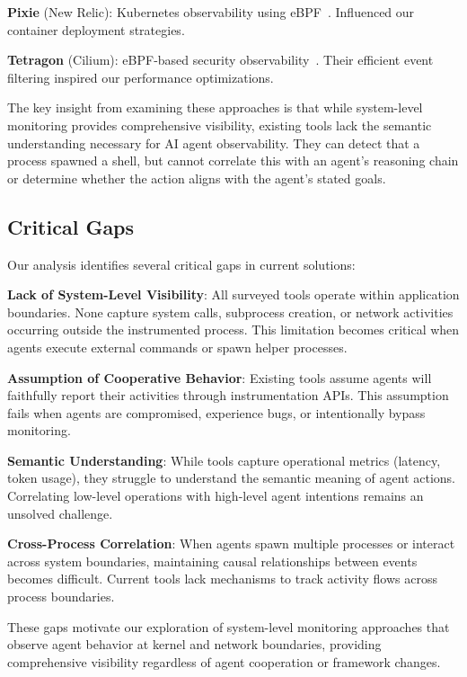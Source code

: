 \documentclass[sigplan,screen，review,9pt]{acmart}
\begin{document}
\textbf{Pixie} (New Relic): Kubernetes observability using eBPF~\cite{pixie}. Influenced our container deployment strategies.

\textbf{Tetragon} (Cilium): eBPF-based security observability~\cite{tetragon}. Their efficient event filtering inspired our performance optimizations.

The key insight from examining these approaches is that while system-level monitoring provides comprehensive visibility, existing tools lack the semantic understanding necessary for AI agent observability. They can detect that a process spawned a shell, but cannot correlate this with an agent's reasoning chain or determine whether the action aligns with the agent's stated goals.

\subsection{Critical Gaps}

Our analysis identifies several critical gaps in current solutions:

\textbf{Lack of System-Level Visibility}: All surveyed tools operate within application boundaries. None capture system calls, subprocess creation, or network activities occurring outside the instrumented process. This limitation becomes critical when agents execute external commands or spawn helper processes.

\textbf{Assumption of Cooperative Behavior}: Existing tools assume agents will faithfully report their activities through instrumentation APIs. This assumption fails when agents are compromised, experience bugs, or intentionally bypass monitoring.

\textbf{Semantic Understanding}: While tools capture operational metrics (latency, token usage), they struggle to understand the semantic meaning of agent actions. Correlating low-level operations with high-level agent intentions remains an unsolved challenge.

\textbf{Cross-Process Correlation}: When agents spawn multiple processes or interact across system boundaries, maintaining causal relationships between events becomes difficult. Current tools lack mechanisms to track activity flows across process boundaries.

These gaps motivate our exploration of system-level monitoring approaches that observe agent behavior at kernel and network boundaries, providing comprehensive visibility regardless of agent cooperation or framework changes.
\end{document}
